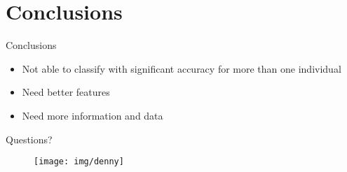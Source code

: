 \section{Conclusions}
\begin{frame}{Conclusions}
    \begin{block}{ } \begin{itemize}
    	\item Not able to classify with significant accuracy for more than one individual
    	\item Need better features
    	\item Need more information and data
    \end{itemize} \end{block}
\end{frame}
\begin{frame}{Questions?}
    \begin{figure}
    \texttt{[image: img/denny]}
    \end{figure}
\end{frame}







